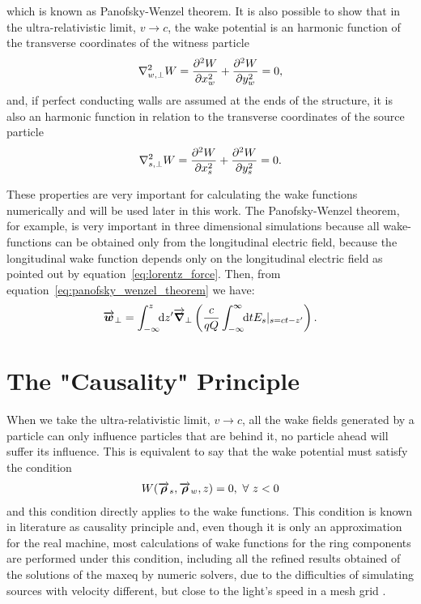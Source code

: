     which is known as Panofsky-Wenzel theorem. It is also possible to show that in the ultra-relativistic limit, $v \to c$, the wake potential is an harmonic function of the transverse coordinates of the witness particle~\cite{Stupakov2000a}
    \begin{align}\label{eq:potential_harmonic}
  	  	\nabla^2_{w,\perp} W = \derpar[2]{W}{x_w} + \derpar[2]{W}{y_w} = 0,
    \end{align}
    and, if perfect conducting walls are assumed at the ends of the structure, it is also an harmonic function in relation to the transverse coordinates of the source particle~\cite{Zagorodnov2015}
    \begin{align}\label{eq:potential_harmonic_source}
  	  	\nabla^2_{s,\perp} W = \derpar[2]{W}{x_s} + \derpar[2]{W}{y_s} = 0.
    \end{align}

    These properties are very important for calculating the wake functions numerically and will be used later in this work. The Panofsky-Wenzel theorem, for example, is very important in three dimensional simulations because all wake-functions can be obtained only from the longitudinal electric field, because the longitudinal wake function depends only on the longitudinal electric field as pointed out by equation~\eqref{eq:lorentz_force}. Then, from equation~\eqref{eq:panofsky_wenzel_theorem} we have:
    \begin{align}
  	  	\vect{w}_\perp = \defint{z'}{\vect{\nabla}_\perp\left(\frac{c}{qQ}\infint{t}{E_s|_{s=ct-z'}}\right)}{-\infty}{z}.
    \end{align}

\section{The "Causality" Principle}

    When we take the ultra-relativistic limit, $v \to c$, all the wake fields generated by a particle can only influence particles that are behind it, no particle ahead will suffer its influence. This is equivalent to say that the wake potential must satisfy the condition
    \begin{align}
  	  	W(\vect{\rho}_s, \vect{\rho}_w, z) = 0, \,\,  \forall\,\, z < 0
    \end{align}
    and this condition directly applies to the wake functions. This condition is known in literature as causality principle and, even though it is only an approximation for the real machine, most calculations of wake functions for the ring components are performed under this condition, including all the refined results obtained of the solutions of the \gls{maxeq} by numeric solvers, due to the difficulties of simulating sources with velocity different, but close to the light's speed in a mesh grid \cite{MagazineImp}.

